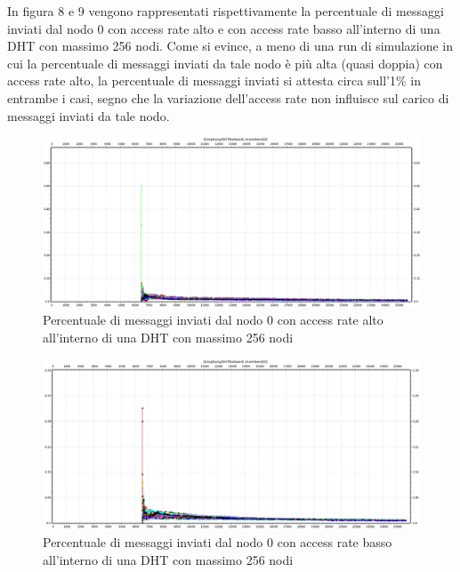 \documentclass[	
	DIV=calc,
	paper=a4,
	fontsize=11pt,
	onecolumn
]{scrartcl} %
\begin{document}
	In figura 8 e 9 vengono rappresentati rispettivamente la percentuale di messaggi inviati dal nodo 0 con access rate alto e con access rate basso all'interno di una DHT con massimo 256 nodi. Come si evince, a meno di una run di simulazione in cui la percentuale di messaggi inviati da tale nodo è più alta (quasi doppia) con access rate alto, la percentuale di messaggi inviati si attesta circa sull'1\% in entrambe i casi, segno che la variazione dell'access rate non influisce sul carico di messaggi inviati da tale nodo.
	
	\begin{figure}[H]
		\centering
		\includegraphics[scale=0.35]	{SymphonyDHT/plots/PercentageOfMessagesSent/256_Nodes_FastAccess/SymphonyDHT_256Nodes_FastAccess_Node0.png}
		\caption{Percentuale di messaggi inviati dal nodo 0 con access rate alto all'interno di una DHT con massimo 256 nodi}
		\label{Figura 8}
	\end{figure}
	\begin{figure}[H]
		\centering
		\includegraphics[scale=0.35]	{SymphonyDHT/plots/PercentageOfMessagesSent/256_Nodes_SlowAccess/SymphonyDHT_256Nodes_SlowAccess_Node0.png}
		\caption{Percentuale di messaggi inviati dal nodo 0 con access rate basso all'interno di una DHT con massimo 256 nodi}
		\label{Figura 9}
	\end{figure}	
	
\end{document}
